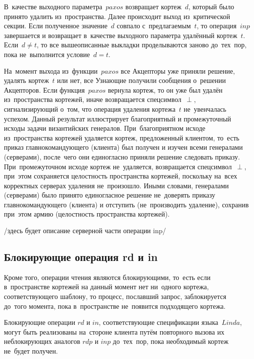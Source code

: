 В~качестве выходного параметра~$paxos$ возвращает кортеж~$d$, который было принято удалить из~пространства. Далее происходит выход из~критической секции. Если полученное значение~$d$ совпало с~предлагаемым~$t$, то операция~$inp$ завершается и возвращает в~качестве выходного параметра удалённый кортеж~$t$. Если~$d \ne t$, то все вышеописанные выкладки проделываются заново до~тех~пор, пока не~выполнится условие~$d = t$.

На~момент выхода из~функции~$paxos$ все Акцепторы уже приняли решение, удалять кортеж~$t$ или нет, все Узнающие получили сообщения о~решении Акцепторов. Если функция~$paxos$ вернула кортеж, то он уже был удалён из~пространства кортежей, иначе возвращается спецсимвол~$\perp$, сигнализирующий о~том, что операция удаления кортежа~$t$ не~увенчалась успехом. Данный результат иллюстрирует благоприятный и промежуточный исходы задачи византийских генералов. При~благоприятном исходе из~пространства кортежей удаляется кортеж, предложенный клиентом, то~есть приказ главнокомандующего (клиента) был получен и изучен всеми генералами (серверами), после~чего они единогласно приняли решение следовать приказу. При~промежуточном исходе кортеж не~удаляется, возвращается спецсимвол~$\perp$, при~этом сохраняется целостность пространства кортежей, поскольку на~всех корректных серверах удаления не~произошло. Иными словами, генералами (серверами) было принято единогласное решение не~доверять приказу главнокомандующего (клиента) и отступить (не~производить удаление), сохранив при~этом армию (целостность пространства кортежей).

/здесь будет описание серверной части операции inp/

\subsection{Блокирующие операция rd и in}\label{subsec5:4}
Кроме того, операции чтения являются блокирующими, то~есть если в~пространстве кортежей на данный момент нет ни~одного кортежа, соответствующего шаблону, то процесс, пославший запрос, заблокируется до~того момента, пока в~пространстве не~появится подходящего кортежа.

Блокирующие операции $rd$ и $in$, соответствующие спецификации языка~$Linda$, могут быть реализованы на~стороне клиента путём повторного вызова их неблокирующих аналогов $rdp$ и $inp$ до~тех~пор, пока необходимый кортеж не~будет получен.





